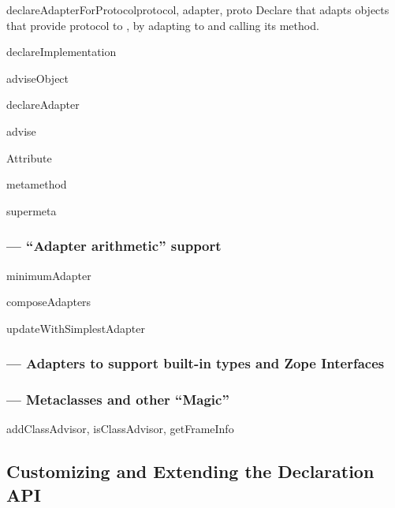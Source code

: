 \begin{verbatim%
}
\begin{verbatim%
}
\begin{verbatim%
}
\begin{verbatim%
}
\begin{funcdesc}{declareAdapterForProtocol}{protocol, adapter, proto }
Declare that  adapts objects that provide protocol 
to , by adapting  to  and
calling its  method.
\end{funcdesc}

declareImplementation

adviseObject

declareAdapter

advise

Attribute

metamethod

supermeta




\subsubsection{ --- ``Adapter arithmetic'' support}

minimumAdapter

composeAdapters

updateWithSimplestAdapter

\subsubsection{ --- Adapters to support built-in types
and Zope Interfaces}

\subsubsection{ --- Metaclasses and other ``Magic''}

addClassAdvisor, isClassAdvisor, getFrameInfo



























\subsection{Customizing and Extending the Declaration API\label{customizing-adaptation}}



\end{verbatim%
}
\end{verbatim%
}
\end{verbatim%
}
\end{verbatim%
}

